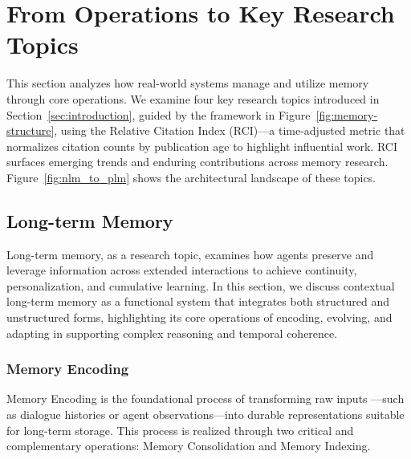 \documentclass[manuscript,screen]{acmart}
\newcommand{\zhaowei}[1]{\textcolor{cyan}{[ZW: #1]}}
\begin{document}
\section{From Operations to Key Research Topics}

\label{sec:memory_topics}

This section analyzes how real-world systems manage and utilize memory through core operations. We examine four key research topics introduced in Section~\ref{sec:introduction}, guided by the framework in Figure~\ref{fig:memory-structure}, using the Relative Citation Index (RCI)—a time-adjusted metric that normalizes citation counts by publication age to highlight influential work. RCI surfaces emerging trends and enduring contributions across memory research. Figure~\ref{fig:nlm_to_plm} shows the architectural landscape of these topics.

\subsection{Long-term Memory}
Long-term memory, as a research topic, examines how agents preserve and leverage information across extended interactions to achieve continuity, personalization, and cumulative learning. In this section, we discuss contextual long-term memory as a functional system that integrates both structured and unstructured forms, highlighting its core operations of encoding, evolving, and adapting in supporting complex reasoning and temporal coherence.

\subsubsection{Memory Encoding} Memory Encoding is the foundational process of transforming raw inputs —such as dialogue histories or agent observations—into durable representations suitable for long-term storage. This process is realized through two critical and complementary operations: Memory Consolidation and Memory Indexing.

\end{document}
